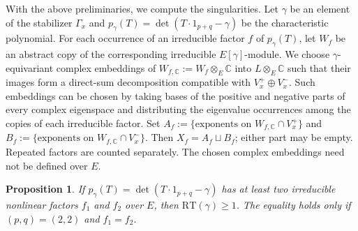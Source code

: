 \documentclass[11pt]{amsart}
\theoremstyle{plain}
\newtheorem{prop}[thm]{Proposition}
\theoremstyle{definition}
\numberwithin{equation}{section}
\def\det{\mathop{\mathrm{det}}\nolimits}
\newcommand{\bbC}{\mathbb{C}}
\begin{document}
With the above preliminaries, we compute the singularities.
Let $\gamma$ be an element of the stabilizer $\Gamma_x$ and $p_\gamma(T) = \det(T \cdot 1_{p+q} - \gamma)$ be the characteristic polynomial.
For each occurrence of an irreducible factor $f$ of
$p_\gamma(T)$, let $W_f$ be an abstract copy of the
corresponding irreducible $E[\gamma]$-module.
We choose $\gamma$-equivariant complex embeddings of
$W_{f,\bbC}:=W_f\otimes_E\bbC$ into $L\otimes_E\bbC$
such that their images form a direct-sum decomposition
compatible with $V_x^+\oplus V_x^-$.
Such embeddings can be chosen by taking bases of the
positive and negative parts of every complex eigenspace
and distributing the eigenvalue occurrences among the
copies of each irreducible factor.
Set
$A_f:=\{\text{exponents on }W_{f,\bbC}\cap V_x^+\}$
and
$B_f:=\{\text{exponents on }W_{f,\bbC}\cap V_x^-\}$.
Then $X_f=A_f\sqcup B_f$; either part may be empty.
Repeated factors are counted separately.
The chosen complex embeddings need not be defined over $E$.
\begin{prop}\label{prop_two_nonlinear_factor}
  If $p_\gamma(T) = \det(T \cdot 1_{p+q} - \gamma)$ has at least two irreducible nonlinear 
  factors $f_1$ and $f_2$ over $E$, then
  $\mathrm{RT}(\gamma) \geq 1$.
  The equality holds only if $(p,q) = (2,2)$ and $f_1=f_2$.
\end{prop}
\end{document}
